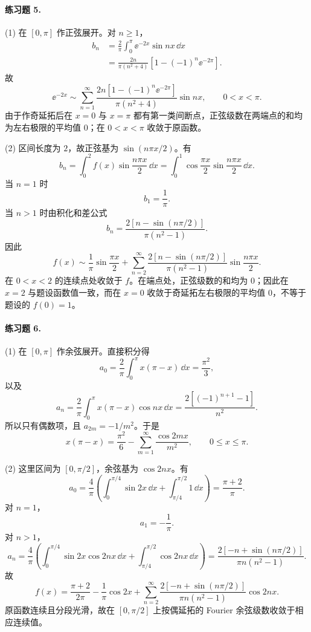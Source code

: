\paragraph{练习题 5.}
\begin{xsolution}
(1) 在 $[0,\pi]$ 作正弦展开。对 $n\ge1$，
\begin{align*}
  b_n
  &=\frac2\pi\int_0^\pi\ee^{-2x}\sin nx\,\dd x\\
  &=\frac{2n}{\pi(n^2+4)}
    \left[1-(-1)^n\ee^{-2\pi}\right].
\end{align*}
故
\[
  \boxed{\displaystyle
  \ee^{-2x}\sim
  \sum_{n=1}^{\infty}
  \frac{2n[1-(-1)^n\ee^{-2\pi}]}{\pi(n^2+4)}\sin nx,
  \qquad0<x<\pi }.
\]
由于作奇延拓后在 $x=0$ 与 $x=\pi$ 都有第一类间断点，正弦级数在两端点的和均为左右极限的平均值 $0$；在 $0<x<\pi$ 收敛于原函数。

(2) 区间长度为 $2$，故正弦基为 $\sin(n\pi x/2)$。有
\[
  b_n=\int_0^2f(x)\sin\frac{n\pi x}{2}\,\dd x
  =\int_0^1\cos\frac{\pi x}{2}\sin\frac{n\pi x}{2}\,\dd x.
\]
当 $n=1$ 时
\[
  b_1=\frac1\pi.
\]
当 $n>1$ 时由积化和差公式
\[
  b_n=\frac{2[n-\sin(n\pi/2)]}{\pi(n^2-1)}.
\]
因此
\[
  \boxed{\displaystyle
  f(x)\sim\frac1\pi\sin\frac{\pi x}{2}
  +\sum_{n=2}^{\infty}
  \frac{2[n-\sin(n\pi/2)]}{\pi(n^2-1)}
  \sin\frac{n\pi x}{2} }.
\]
在 $0<x<2$ 的连续点处收敛于 $f$。在端点处，正弦级数的和均为 $0$；因此在 $x=2$ 与题设函数值一致，而在 $x=0$ 收敛于奇延拓左右极限的平均值 $0$，不等于题设的 $f(0)=1$。
\end{xsolution}

\paragraph{练习题 6.}
\begin{xsolution}
(1) 在 $[0,\pi]$ 作余弦展开。直接积分得
\[
  a_0=\frac2\pi\int_0^\pi x(\pi-x)\,\dd x=\frac{\pi^2}{3},
\]
以及
\[
  a_n=\frac2\pi\int_0^\pi x(\pi-x)\cos nx\,\dd x
  =\frac{2[(-1)^{n+1}-1]}{n^2}.
\]
所以只有偶数项，且 $a_{2m}=-1/m^2$。于是
\[
  \boxed{\displaystyle
  x(\pi-x)=\frac{\pi^2}{6}-
  \sum_{m=1}^{\infty}\frac{\cos2mx}{m^2},
  \qquad0\le x\le\pi }.
\]

(2) 这里区间为 $[0,\pi/2]$，余弦基为 $\cos2nx$。有
\[
  a_0=\frac4\pi\left(
  \int_0^{\pi/4}\sin2x\,\dd x+
  \int_{\pi/4}^{\pi/2}1\,\dd x\right)
  =\frac{\pi+2}{\pi}.
\]
对 $n=1$，
\[
  a_1=-\frac1\pi.
\]
对 $n>1$，
\[
  a_n=\frac4\pi\left(
  \int_0^{\pi/4}\sin2x\cos2nx\,\dd x+
  \int_{\pi/4}^{\pi/2}\cos2nx\,\dd x\right)
  =\frac{2[-n+\sin(n\pi/2)]}{\pi n(n^2-1)}.
\]
故
\[
  \boxed{\displaystyle
  f(x)=\frac{\pi+2}{2\pi}-\frac1\pi\cos2x
  +\sum_{n=2}^{\infty}
  \frac{2[-n+\sin(n\pi/2)]}{\pi n(n^2-1)}\cos2nx }.
\]
原函数连续且分段光滑，故在 $[0,\pi/2]$ 上按偶延拓的 Fourier 余弦级数收敛于相应连续值。
\end{xsolution}

